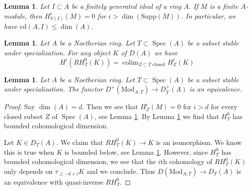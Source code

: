 \documentclass[10pt,a4paper]{amsart}
\theoremstyle{plain}
\newtheorem{lemma}[subsection]{Lemma}
\theoremstyle{definition}
\theoremstyle{remark}
\numberwithin{equation}{subsection}
\def\colim{\mathop{\mathrm{colim}}\nolimits}
\def\Spec{\mathop{\mathrm{Spec}}}
\begin{document}
\begin{lemma}
\label{lemma-cd-dimension}
Let $I \subset A$ be a finitely generated ideal of a ring $A$.
If $M$ is a finite $A$-module, then
$H^i_{V(I)}(M) = 0$ for $i > \dim(\text{Supp}(M))$.
In particular, we have $\text{cd}(A, I) \leq \dim(A)$.
\end{lemma}

\begin{lemma}
\label{lemma-adjoint-ext}
Let $A$ be a Noetherian ring. Let $T \subset \Spec(A)$
be a subset stable under specialization.
For any object $K$ of $D(A)$ we have
$$
H^i(RH^0_T(K)) = \colim_{Z \subset T\text{ closed}} H^i_Z(K)
$$
\end{lemma}

\begin{lemma}
\label{lemma-equal-plus}
Let $A$ be a Noetherian ring. Let $T \subset \Spec(A)$ be a subset stable
under specialization. The functor $D^+(\text{Mod}_{A, T}) \to D^+_T(A)$
is an equivalence.
\end{lemma}

\begin{proof}
Say $\dim(A) = d$. Then we see that $H^i_Z(M) = 0$ for $i > d$
for every closed subset $Z$ of $\Spec(A)$, see
Lemma \ref{lemma-cd-dimension}.
By Lemma \ref{lemma-adjoint-ext} we find that $H^0_T$ has bounded
cohomological dimension.

\medskip\noindent
Let $K \in D_T(A)$. We claim that $RH^0_T(K) \to K$ is an
isomorphism. We know this is true when $K$ is bounded below, see
Lemma \ref{lemma-equal-plus}. However, since $H^0_T$ has bounded
cohomological dimension, we see that the $i$th cohomology of
$RH_T^0(K)$ only depends on $\tau_{\geq -d + i}K$ and we conclude.
Thus $D(\text{Mod}_{A, T}) \to D_T(A)$ is an equivalence with
quasi-inverse $RH^0_T$.
\end{proof}
\end{document}
